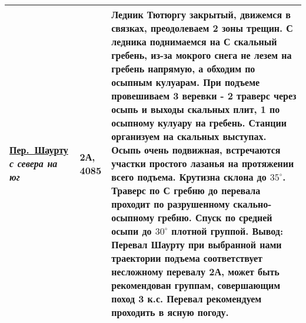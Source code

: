 {\begin{longtable}{|>{\centering\arraybackslash}m{3.8cm}|>{\centering\arraybackslash}m{1.3cm}|>{\raggedright\arraybackslash}m{12.5cm}|}
			\hyperref[subsec:Day12]{Пер.~Шаурту}																	\newline\textit{с севера на юг}			&	2А,	4085					&	Ледник Тютюргу закрытый, движемся в связках, преодолеваем 2 зоны трещин. С ледника поднимаемся на С скальный гребень, из-за мокрого снега не лезем на гребень напрямую, а обходим по осыпным кулуарам. При подъеме провешиваем 3 веревки - 2 траверс через осыпь и выходы скальных плит, 1 по осыпному кулуару на гребень. Станции организуем на скальных выступах. Осыпь очень подвижная, встречаются участки простого лазанья на протяжении всего подъема. Крутизна склона до $35^\circ$. Траверс по С гребню до перевала проходит по разрушенному скально-осыпному гребню. Спуск по средней осыпи до $30^\circ$ плотной группой. \newline \textbf{Вывод:} Перевал Шаурту при выбранной нами траектории подъема соответствует несложному перевалу 2А, может быть рекомендован группам, совершающим поход 3 к.с. Перевал рекомендуем проходить в ясную погоду.																																																																																																																																																																																																																																																																															\\ \hline

\end{longtable}}
